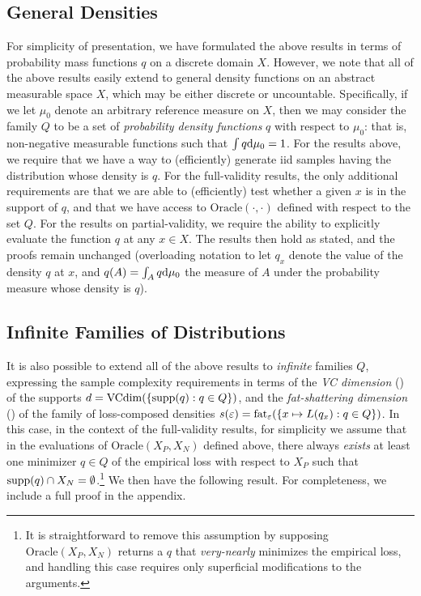 \newcommand{\fat}{s}
\newcommand{\vc}{d}

\subsection{General Densities}
\label{sec:densities}

For simplicity of presentation, we have formulated the above results in terms of probability mass functions $q$ on a discrete domain $X$.
However, we note that all of the above results easily extend to general density functions on an abstract measurable space $X$, which 
may be either discrete or uncountable.  Specifically, if we let $\mu_{0}$ denote an arbitrary reference measure on $X$, 
then we may consider the family $Q$ to be a set of \emph{probability density functions} $q$ with respect to $\mu_{0}$: that is, 
non-negative measurable functions such that $\int q {\rm d}\mu_{0} = 1$.  
For the results above, we require that we have a way to (efficiently) generate iid samples having the distribution whose density is $q$.
For the full-validity results, the only additional requirements are that we are able to (efficiently) test whether a given $x$ is in the support of $q$,
and that we have access to $\text{Oracle}(\cdot,\cdot)$ defined with respect to the set $Q$.
For the results on partial-validity, we require the ability to explicitly evaluate the function $q$ at any $x \in X$.
The results then hold as stated, and the proofs remain unchanged (overloading notation to let $q_{x}$ denote the 
value of the density $q$ at $x$, and $q(A) = \int_{A} q {\rm d}\mu_{0}$ the measure of $A$ 
under the probability measure whose density is $q$).

\subsection{Infinite Families of Distributions}
\label{sec:infinite-families}


It is also possible to extend all of the above results to \emph{infinite} families $Q$, 
expressing the sample complexity requirements in terms of the \emph{VC dimension} (\cite{VapnikC74}) of the supports $\vc = {\rm VCdim}(\{\Supp(q) : q \in Q\})$, 
and the \emph{fat-shattering dimension} (\cite{AlonBCH97}) of the family of loss-composed densities $\fat(\epsilon) = {\rm fat}_{\epsilon}(\{ x \mapsto L(q_{x}) : q \in Q \})$.
In this case, in the context of the full-validity results, 
for simplicity we assume that in the evaluations of $\text{Oracle}(X_{P},X_{N})$ defined above, 
there always \emph{exists} at least one minimizer $q \in Q$ of the empirical loss with respect to $X_{P}$ 
such that $\text{supp}(q) \cap X_{N} = \emptyset$.\footnote{It is straightforward to remove this assumption by supposing 
$\text{Oracle}(X_{P},X_{N})$ returns a $q$ that \emph{very-nearly} minimizes the empirical loss, and handling 
this case requires only superficial modifications to the arguments.}
We then have the following result.  For completeness, we include a full proof in the appendix.

